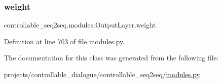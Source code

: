 \mbox{\label{classcontrollable__seq2seq_1_1modules_1_1OutputLayer_a63d3fce378c2d83c183b2883c1766552}} 
\subsubsection{\texorpdfstring{weight}{weight}}
{\footnotesize\ttfamily controllable\+\_\+seq2seq.\+modules.\+Output\+Layer.\+weight}



Definition at line 703 of file modules.\+py.



The documentation for this class was generated from the following file\+:\begin{DoxyCompactItemize}
\item 
projects/controllable\+\_\+dialogue/controllable\+\_\+seq2seq/\hyperlink{projects_2controllable__dialogue_2controllable__seq2seq_2modules_8py}{modules.\+py}\end{DoxyCompactItemize}
